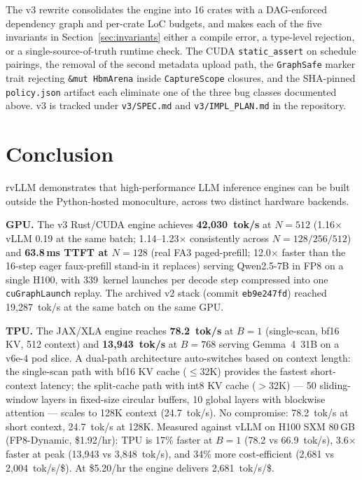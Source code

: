 The v3 rewrite consolidates the engine into 16 crates with a
DAG-enforced dependency graph and per-crate LoC budgets, and makes
each of the five invariants in Section~\ref{sec:invariants} either a
compile error, a type-level rejection, or a single-source-of-truth
runtime check. The CUDA \texttt{static\_assert} on schedule pairings,
the removal of the second metadata upload path, the
\texttt{GraphSafe} marker trait rejecting
\texttt{\&mut HbmArena} inside \texttt{CaptureScope} closures, and the
SHA-pinned \texttt{policy.json} artifact each eliminate one of the
three bug classes documented above. v3 is tracked under
\texttt{v3/SPEC.md} and \texttt{v3/IMPL\_PLAN.md} in the repository.

\section{Conclusion}
\label{sec:conclusion}

rvLLM demonstrates that high-performance LLM inference engines can be
built outside the Python-hosted monoculture, across two distinct hardware
backends.

\textbf{GPU.} The v3 Rust/CUDA engine achieves
\textbf{42{,}030~tok/s} at $N\!=\!512$ (1.16$\times$ vLLM 0.19 at the
same batch; 1.14--1.23$\times$ consistently across
$N\!=\!128/256/512$) and \textbf{63.8\,ms TTFT at $N\!=\!128$} (real
FA3 paged-prefill; 12.0$\times$ faster than the 16-step eager
faux-prefill stand-in it replaces) serving Qwen2.5-7B in FP8 on a
single H100, with 339~kernel launches per decode step compressed into
one \texttt{cuGraphLaunch} replay. The archived v2 stack (commit
\texttt{eb9e247fd}) reached 19{,}287~tok/s at the same batch on the
same GPU.

\textbf{TPU.} The JAX/XLA engine reaches \textbf{78.2~tok/s} at
$B\!=\!1$ (single-scan, bf16 KV, 512 context) and \textbf{13{,}943~tok/s} at
$B\!=\!768$ serving Gemma~4~31B on a v6e-4 pod slice. A dual-path
architecture auto-switches based on context length: the single-scan path
with bf16 KV cache ($\le$32K) provides the fastest short-context latency;
the split-cache path with int8 KV cache ($>$32K) --- 50 sliding-window
layers in fixed-size circular buffers, 10 global layers with blockwise
attention --- scales to 128K context (24.7~tok/s). No compromise:
78.2~tok/s at short context, 24.7~tok/s at 128K. Measured against vLLM on
H100 SXM 80\,GB (FP8-Dynamic, \$1.92/hr): TPU is 17\% faster at
$B{=}1$ (78.2 vs 66.9~tok/s), 3.6$\times$ faster at peak (13{,}943 vs
3{,}848~tok/s), and 34\% more cost-efficient (2{,}681 vs
2{,}004~tok/s/\$). At \$5.20/hr the engine delivers
2{,}681~tok/s/\$.

